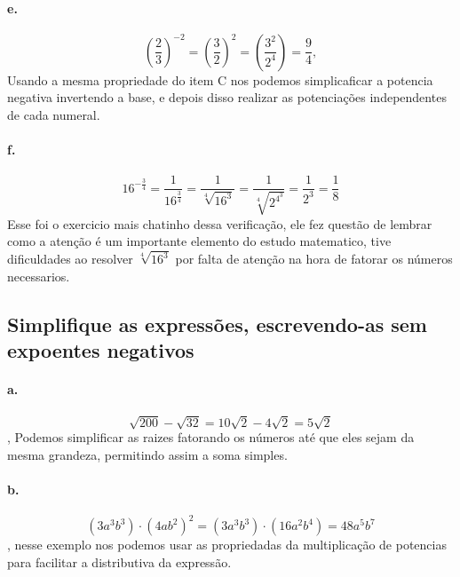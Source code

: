 	\paragraph{e.}
	\begin{equation}
	\left(\frac{2}{3}\right)^{-2} = \left(\frac{3}{2}\right)^{2} = \left(\frac{3^2}{2^4}\right) = \frac{9}{4},
	\end{equation}
	Usando a mesma propriedade do item C nos podemos simplicaficar a potencia negativa invertendo a base, e depois disso realizar as potenciações independentes de cada numeral.

	\paragraph{f.}
	\begin{equation}
	16^{-\frac{3}{4}} = \frac{1}{16^{\frac{3}{4}}} = \frac{1}{\sqrt[4]{16^3}} = \frac{1}{\sqrt[4]{2^{4^{3}}}} = \frac{1}{2^3} = \frac{1}{8} 
	\end{equation}
	Esse foi o exercicio mais chatinho dessa verificação, ele fez questão de lembrar como a atenção é um importante elemento do estudo matematico, tive dificuldades ao resolver $\sqrt[4]{16^3}$ por falta de atenção na hora de fatorar os números necessarios.

\subsection{Simplifique as expressões, escrevendo-as sem expoentes negativos}

	\paragraph{a.}
	\begin{equation}
	\sqrt{200} - \sqrt{32} = 10\sqrt{2} - 4\sqrt{2} = 5\sqrt{2}
	\end{equation},
	Podemos simplificar as raizes fatorando os números até que eles sejam da mesma grandeza, permitindo assim a soma simples.

	\paragraph{b.}
	\begin{equation}
	(3a^3b^3)\cdot(4ab^2)^2 = (3a^3b^3)\cdot(16a^2b^4)= 48a^5b^7
	\end{equation},
	nesse exemplo nos podemos usar as propriedadas da multiplicação de potencias para facilitar a distributiva da expressão.
	
